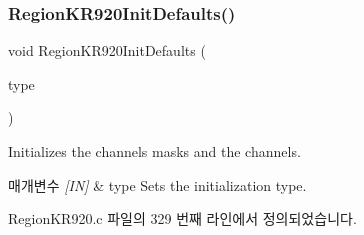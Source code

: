 \subsubsection{\texorpdfstring{Region\+K\+R920\+Init\+Defaults()}{RegionKR920InitDefaults()}}
{\footnotesize\ttfamily void Region\+K\+R920\+Init\+Defaults (\begin{DoxyParamCaption}\item[{\mbox{\hyperlink{group___r_e_g_i_o_n_gaddc73ae10673ec925724e7870363bda9}{Init\+Type\+\_\+t}}}]{type }\end{DoxyParamCaption})}



Initializes the channels masks and the channels. 


\begin{DoxyParams}{매개변수}
{\em \mbox{[}\+I\+N\mbox{]}} & type Sets the initialization type. \\
\hline
\end{DoxyParams}


Region\+K\+R920.\+c 파일의 329 번째 라인에서 정의되었습니다.


